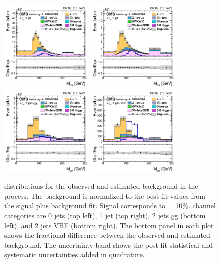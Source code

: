 \begin{figure}[htbp!]
  \centering
  \includegraphics[width=0.4\textwidth]{plots/chapter9/CB/etau/0jet.png}
  \includegraphics[width=0.4\textwidth]{plots/chapter9/CB/etau/1jet.png} \\
  \includegraphics[width=0.4\textwidth]{plots/chapter9/CB/etau/2jet_gg.png}
  \includegraphics[width=0.4\textwidth]{plots/chapter9/CB/etau/2jet_vbf.png} \\
  \caption{\mcol distributions for the observed and estimated background in the \Hehad process. The background is normalized to the best fit values from the signal plus background fit. Signal corresponds to \BHet = 10\%. \Hehad channel categories are 0 jets (top left), 1 jet (top right), 2 jets gg (bottom left), and 2 jets VBF (bottom right). The bottom panel in each plot shows the fractional difference between the observed and estimated background. The uncertainty band shows the post fit statistical and systematic uncertainties added in quadrature.}
  \label{fig:mcol_ehad}
\end{figure}

